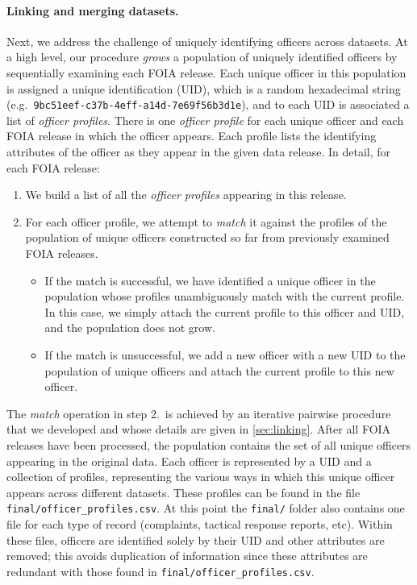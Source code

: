 \paragraph{Linking and merging datasets.}
Next, we address the challenge of uniquely identifying officers across datasets.
At a high level, our procedure \emph{grows} a population of uniquely identified
officers by sequentially examining each FOIA release. Each unique officer in
this population is assigned a unique identification (UID), which is a random hexadecimal string (e.g.\
\texttt{9bc51eef-c37b-4eff-a14d-7e69f56b3d1e}), and to each UID is associated
a list of \emph{officer profiles}. There is one \emph{officer profile} for each
unique officer and each FOIA release in which the officer appears.  Each profile lists
the identifying attributes of the officer as they appear in the given data
release. In detail, for each FOIA release:
\begin{enumerate}
	\item We build a list of all the \emph{officer profiles} appearing in this
		release.
	\item For each officer profile, we attempt to \emph{match} it against the
		profiles of the population of unique officers constructed so far from
		previously examined FOIA releases.
		\begin{itemize}
			\item If the match is successful, we have identified a unique officer in
				the population whose profiles unambiguously match with the
				current profile. In this case, we simply attach the current
				profile to this officer and UID, and
				the population does not grow.
			\item If the match is unsuccessful, we add a new officer with a new UID to the population of unique
				officers and attach the current profile to this new officer.
		\end{itemize}
\end{enumerate}

The \emph{match} operation in step 2.\ is achieved by an iterative pairwise
procedure that we developed and whose details are given  in \cref{sec:linking}.
After all FOIA releases have been processed, the population contains the set of
all unique officers appearing in the original data. Each officer is represented
by a UID and a collection of profiles, representing the various ways in which
this unique officer appears across different datasets. These profiles can be
found in the file \texttt{final/officer\_profiles.csv}.
At this point the \texttt{final/} folder also contains
one file for each type of record (complaints, tactical response reports, etc).
Within these files, officers are identified solely by their UID and other attributes
are removed; this avoids duplication of
information since these attributes are redundant with those found in
\texttt{final/officer\_profiles.csv}.

